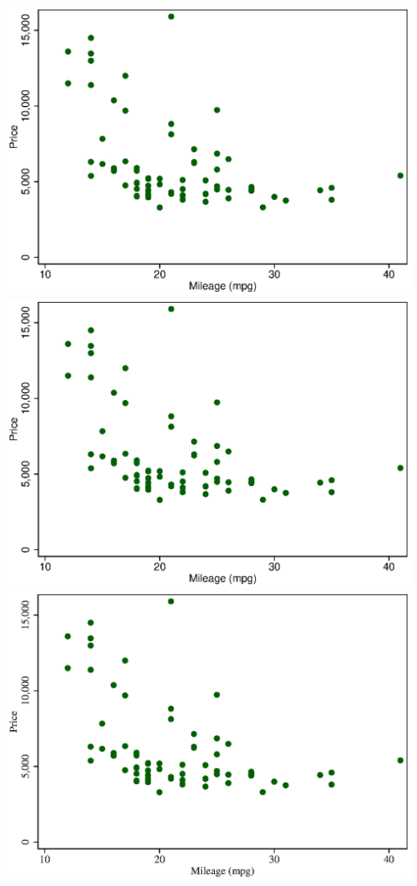 \documentclass[12pt]{article}
\begin{document}
\includegraphics[width=\textwidth]{sample_eps_helvetica.eps}
\includegraphics[width=\textwidth]{sample_eps_arial.eps}
\includegraphics[width=\textwidth]{sample_eps_times.eps}
\end{document}
